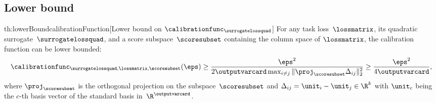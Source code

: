 \documentclass{article}
\begin{document}
\subsection{Lower bound}
\label{sec:boundscalibrationFunction:lower}
\begin{reptheorem}{th:lowerBoundcalibrationFunction}[Lower bound on $\calibrationfunc_{\surrogatelossquad}$]
    \label{th:rep:lowerBoundcalibrationFunction}
     For any task loss~$\lossmatrix$, its quadratic surrogate~$\surrogatelossquad$, and a score subspace~$\scoresubset$ containing the column space of $\lossmatrix$, the calibration function can be lower bounded:
     \begin{equation*}
%
     \calibrationfunc_{\surrogatelossquad,\lossmatrix,\scoresubset}(\eps)
     \geq
     \frac{\eps^2}{2\outputvarcard \max_{i\neq j}\|\proj_{\scoresubset} \Delta_{ij}\|_2^2}
     \geq 
     \frac{\eps^2}{4\outputvarcard},
     \end{equation*}
     where $\proj_{\scoresubset}$ is the orthogonal projection on the subspace~$\scoresubset$ and $\Delta_{ij} = \unit_i - \unit_j \in \R^k$ with $\unit_c$ being the $c$-th basis vector of the standard basis in~$\R^\outputvarcard$.
\end{reptheorem}
\end{document}
